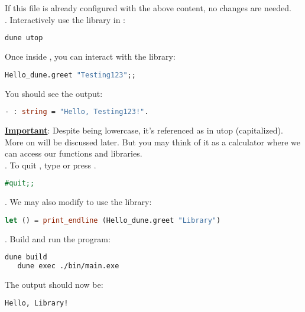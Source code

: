    \noindent If this file is already configured with the above content, no changes are needed.\\

\vspace{.5em}
. Interactively use the library in :
   \begin{lstlisting}[language=Bash]
   dune utop
   \end{lstlisting}

   \noindent Once inside , you can interact with the library:
   \begin{lstlisting}[language=OCaml, caption={Using the Library in Utop}]
   Hello_dune.greet "Testing123";;
   \end{lstlisting}

   \noindent
   You should see the output: 

    \begin{lstlisting}[language=OCaml]
    - : string = "Hello, Testing123!".
    \end{lstlisting}
   \vspace{.5em}
   \noindent
   \underline{\textbf{Important}}: Despite  being lowercase, it's referenced as  in utop (capitalized).
   More on  will be discussed later. But you may think of it as a calculator where we can access our functions and libraries.\\

. To quit , type  or press .
   \begin{lstlisting}[language=OCaml, caption={Quitting utop}]
   #quit;;
   \end{lstlisting}

\newpage
{}. We may also modify  to use the library:
   \begin{lstlisting}[language=OCaml, caption={Using the Library in Main}]
   let () = print_endline (Hello_dune.greet "Library")
   \end{lstlisting}

. Build and run the program:
   \begin{lstlisting}[language=Bash]
   dune build
   dune exec ./bin/main.exe
   \end{lstlisting}

   \noindent The output should now be:
   \begin{lstlisting}[language=Bash]
   Hello, Library!
   \end{lstlisting}

